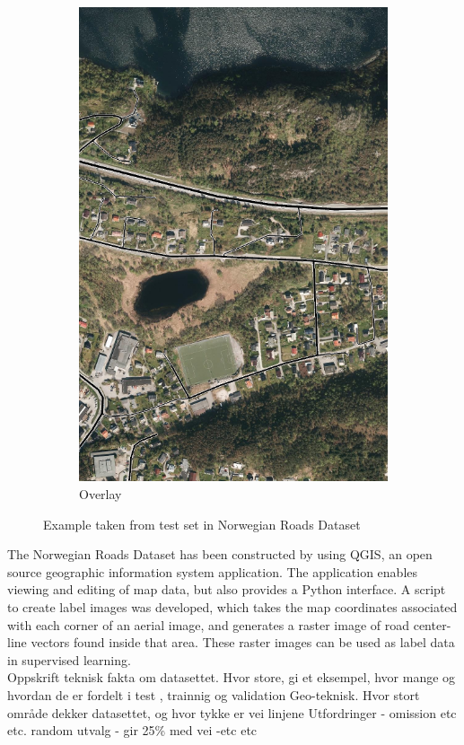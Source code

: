 \begin{figure}
\begin{subfigure}{0.32\textwidth}
\includegraphics[width=\linewidth]{figs/datasets/Norwegian_roads_overlay_example2.png}
\caption{Overlay} \label{fig:norwegian_roads_example_overlay}
\end{subfigure}
\hspace*{\fill} %
\caption{Example taken from test set in Norwegian Roads Dataset} \label{fig:norwegian_roads_example}
\end{figure}

The Norwegian Roads Dataset has been constructed by using QGIS, an open source geographic information system application. The application enables viewing and editing of map data, but also provides a Python interface. A script to create label images was developed, which takes the map coordinates associated with each corner of an aerial image, and generates a raster image of road center-line vectors found inside that area. These raster images can be used as label data in supervised learning. \\

Oppskrift
teknisk fakta om datasettet. Hvor store, gi et eksempel, hvor mange og hvordan de er fordelt i test , trainnig og validation 
Geo-teknisk. Hvor stort område dekker datasettet, og hvor tykke er vei linjene
Utfordringer - omission etc etc.
random utvalg - gir 25\% med vei -etc etc